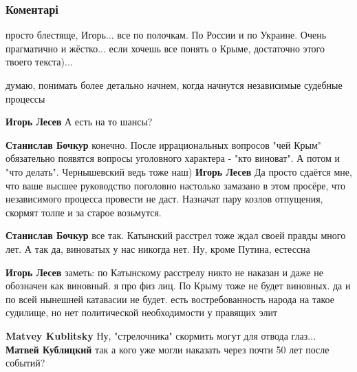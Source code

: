  
 
 
 
 
\subsubsection{Коментарі}

\begin{itemize} %

просто блестяще, Игорь... все по полочкам. По России и по Украине. Очень
прагматично и жёстко... если хочешь все понять о Крыме, достаточно этого твоего
текста)...

\begin{itemize} %
думаю, понимать более детально начнем, когда начнутся независимые судебные процессы

\textbf{Игорь Лесев} А есть на то шансы?

\textbf{Станислав Бочкур} конечно. После иррациональных вопросов "чей Крым" обязательно появятся вопросы уголовного характера - "кто виноват". А потом и "что делать". Чернышевский ведь тоже наш)
\textbf{Игорь Лесев} Да просто сдаётся мне, что ваше высшее руководство поголовно настолько замазано в этом просёре, что независимого процесса провести не даст. Назначат пару козлов отпущения, скормят толпе и за старое возьмутся.

\textbf{Станислав Бочкур} все так. Катынский расстрел тоже ждал своей правды много лет. А так да, виноватых у нас никогда нет. Ну, кроме Путина, естессна

\textbf{Игорь Лесев} заметь: по Катынскому расстрелу никто не наказан и даже не обозначен как виновный. я про физ лиц. По Крыму тоже не будет виновных. да и по всей нынешней катавасии не будет. есть востребованность народа на такое судилище, но нет политической необходимости у правящих элит

\textbf{Matvey Kublitsky} Ну, "стрелочника" скормить могут для отвода глаз...
\textbf{Матвей Кублицкий} так а кого уже могли наказать через почти 50 лет после событий?


\end{itemize}
\end{itemize}
